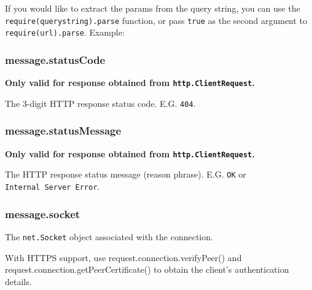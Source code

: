 If you would like to extract the params from the query string, you can
use the
\texttt{require(\textquotesingle{}querystring\textquotesingle{}).parse}
function, or pass \texttt{true} as the second argument to
\texttt{require(\textquotesingle{}url\textquotesingle{}).parse}.
Example:

\begin{Shaded}
\begin{Highlighting}[]
\NormalTok{(}\NormalTok{(}\NormalTok{, }\NormalTok{)}
\NormalTok{\{ }\NormalTok{: }\NormalTok{,}
  \NormalTok{: }\NormalTok{,}
  \NormalTok{: \{ }\NormalTok{: } \NormalTok{\},}
  \NormalTok{: } \NormalTok{\}}
\end{Highlighting}
\end{Shaded}

\subsubsection{message.statusCode}\label{message.statuscode}

\textbf{Only valid for response obtained from
\texttt{http.ClientRequest}.}

The 3-digit HTTP response status code. E.G. \texttt{404}.

\subsubsection{message.statusMessage}\label{message.statusmessage}

\textbf{Only valid for response obtained from
\texttt{http.ClientRequest}.}

The HTTP response status message (reason phrase). E.G. \texttt{OK} or
\texttt{Internal\ Server\ Error}.

\subsubsection{message.socket}\label{message.socket}

The \texttt{net.Socket} object associated with the connection.

With HTTPS support, use request.connection.verifyPeer() and
request.connection.getPeerCertificate() to obtain the client's
authentication details.
